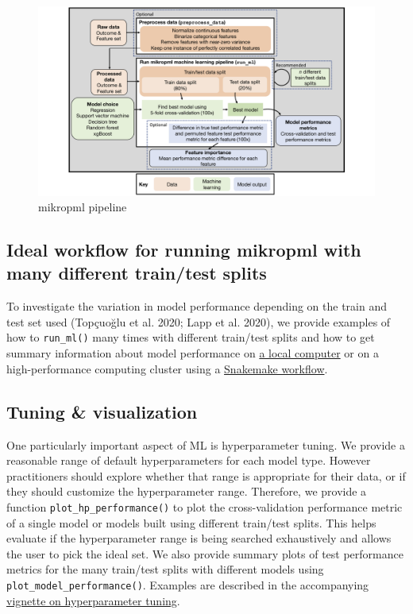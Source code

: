 \documentclass[
]{article}
\begin{document}
\begin{figure}
\centering
\includegraphics[width=1\textwidth,height=\textheight]{mikRopML-pipeline.png}
\caption{mikropml pipeline}
\end{figure}

\hypertarget{ideal-workflow-for-running-mikropml-with-many-different-traintest-splits}{%
\subsection{Ideal workflow for running mikropml with many different
train/test
splits}\label{ideal-workflow-for-running-mikropml-with-many-different-traintest-splits}}

To investigate the variation in model performance depending on the train
and test set used (Topçuoğlu et al. 2020; Lapp et al. 2020), we provide
examples of how to \texttt{run\_ml()} many times with different
train/test splits and how to get summary information about model
performance on
\href{http://www.schlosslab.org/mikropml/articles/parallel.html}{a local
computer} or on a high-performance computing cluster using a
\href{https://github.com/SchlossLab/mikropml-snakemake-workflow}{Snakemake
workflow}.

\hypertarget{tuning-visualization}{%
\subsection{Tuning \& visualization}\label{tuning-visualization}}

One particularly important aspect of ML is hyperparameter tuning. We
provide a reasonable range of default hyperparameters for each model
type. However practitioners should explore whether that range is
appropriate for their data, or if they should customize the
hyperparameter range. Therefore, we provide a function
\texttt{plot\_hp\_performance()} to plot the cross-validation
performance metric of a single model or models built using different
train/test splits. This helps evaluate if the hyperparameter range is
being searched exhaustively and allows the user to pick the ideal set.
We also provide summary plots of test performance metrics for the many
train/test splits with different models using
\texttt{plot\_model\_performance()}. Examples are described in the
accompanying
\href{http://www.schlosslab.org/mikropml/articles/tuning.html}{vignette
on hyperparameter tuning}.
\end{document}
